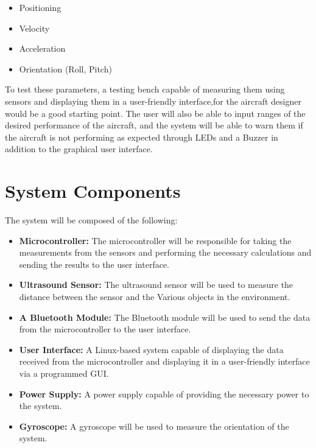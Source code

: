 \documentclass[12pt]{article}
\numberwithin{equation}{section}
\begin{document}
\begin{itemize}
  \item Positioning
  \item Velocity
  \item Acceleration
  \item Orientation (Roll, Pitch)
\end{itemize}

To test these parameters, a testing bench capable of measuring them using sensors and displaying them in a user-friendly interface,for the aircraft designer would be a good starting point.
The user will also be able to input ranges of the desired performance of the aircraft, and the system will be able to warn them if the aircraft is not performing as expected through LEDs and a Buzzer in addition to the graphical user interface.

\section{System Components}
The system will be composed of the following:
\begin{itemize}
  \item \textbf{Microcontroller:} The microcontroller will be responsible for taking the measurements from the sensors and performing the necessary calculations and sending the results to the user interface.
  \item \textbf{Ultrasound Sensor:} The ultrasound sensor will be used to measure the distance between the sensor and the Various objects in the environment.
  \item \textbf{A Bluetooth Module:} The Bluetooth module will be used to send the data from the microcontroller to the user interface.
  \item \textbf{User Interface:} A Linux-based system capable of displaying the data received from the microcontroller and displaying it in a user-friendly interface via a programmed GUI.
  \item \textbf{Power Supply:} A power supply capable of providing the necessary power to the system.
  \item \textbf{Gyroscope:} A gyroscope will be used to measure the orientation of the system.
\end{itemize}
\end{document}
